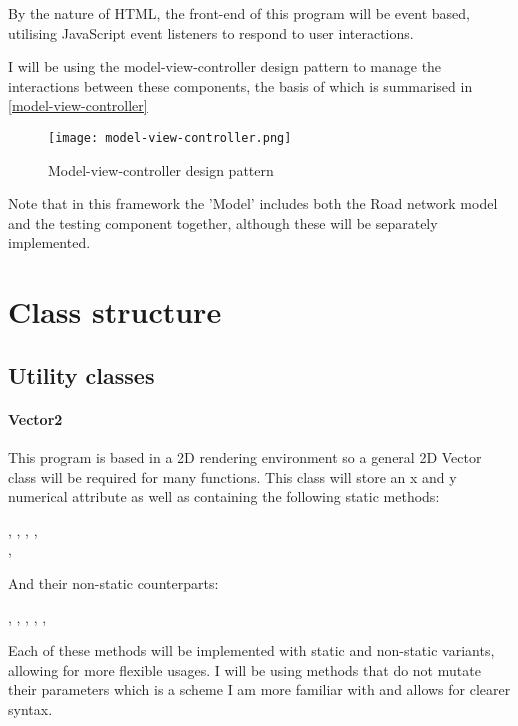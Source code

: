     By the nature of HTML, the front-end of this program will be event based, utilising JavaScript event listeners to respond to user interactions.

    I will be using the model-view-controller design pattern to manage the interactions between these components, the basis of which is summarised in \autoref{model-view-controller}

    \begin{figure}[ht]
        \centering
        \texttt{[image: model-view-controller.png]}
        \caption{Model-view-controller design pattern}
        \label{model-view-controller}
    \end{figure}

    Note that in this framework the 'Model' includes both the Road network model and the testing component together, although these will be separately implemented.

\section{Class structure}

    \subsection{Utility classes}

    \paragraph{Vector2}

        This program is based in a 2D rendering environment so a general 2D Vector class will be required for many functions. This class will store an x and y numerical attribute as well as containing the following static methods:

        ,
        , ,
        ,\\
        ,

        And their non-static counterparts:

        ,
        , ,
        ,
        ,

        Each of these methods will be implemented with static and non-static variants, allowing for more flexible usages. I will be using methods that do not mutate their parameters which is a scheme I am more familiar with and allows for clearer syntax.

